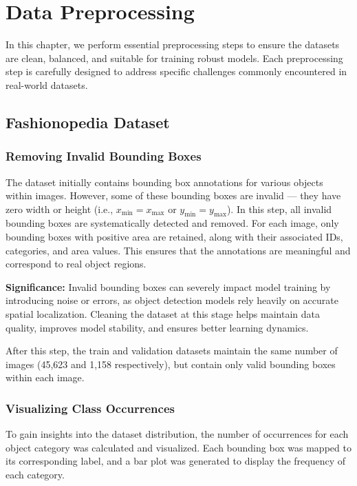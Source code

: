 \chapter{Data Preprocessing}
\label{chap:data_preprocessing}

In this chapter, we perform essential preprocessing steps to ensure the datasets are clean, balanced, and suitable for training robust models. Each preprocessing step is carefully designed to address specific challenges commonly encountered in real-world datasets.

\section{Fashionopedia Dataset}

\subsection{Removing Invalid Bounding Boxes}

The dataset initially contains bounding box annotations for various objects within images. However, some of these bounding boxes are invalid — they have zero width or height (i.e., $x_{\text{min}} = x_{\text{max}}$ or $y_{\text{min}} = y_{\text{max}}$). In this step, all invalid bounding boxes are systematically detected and removed. For each image, only bounding boxes with positive area are retained, along with their associated IDs, categories, and area values. This ensures that the annotations are meaningful and correspond to real object regions.

\textbf{Significance:} Invalid bounding boxes can severely impact model training by introducing noise or errors, as object detection models rely heavily on accurate spatial localization. Cleaning the dataset at this stage helps maintain data quality, improves model stability, and ensures better learning dynamics.

After this step, the train and validation datasets maintain the same number of images (45,623 and 1,158 respectively), but contain only valid bounding boxes within each image.

\subsection{Visualizing Class Occurrences}

To gain insights into the dataset distribution, the number of occurrences for each object category was calculated and visualized. Each bounding box was mapped to its corresponding label, and a bar plot was generated to display the frequency of each category.

